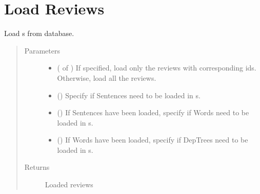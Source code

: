 \documentclass[letterpaper,10pt,english]{sphinxmanual}
\begin{document}
\section{Load Reviews}
\label{\detokenize{load:module-loacore.load.review_load}}\label{\detokenize{load:load-reviews}}

\begin{fulllineitems}
\label{\detokenize{load:loacore.load.review_load.load_reviews}}
Load  s from database.
\begin{quote}\begin{description}
\item[{Parameters}] \leavevmode\begin{itemize}
\item {} 
 ( of ) \textendash{} If specified, load only the reviews with corresponding ids. Otherwise, load all the reviews.

\item {} 
 () \textendash{} Specify if Sentences need to be loaded in  s.

\item {} 
 () \textendash{} If Sentences have been loaded, specify if Words need to be loaded in  s.

\item {} 
 () \textendash{} If Words have been loaded, specify if DepTrees need to be loaded in  s.

\end{itemize}

\item[{Returns}] \leavevmode
Loaded reviews


\end{description}
\end{quote}
\end{fulllineitems}
\end{document}
